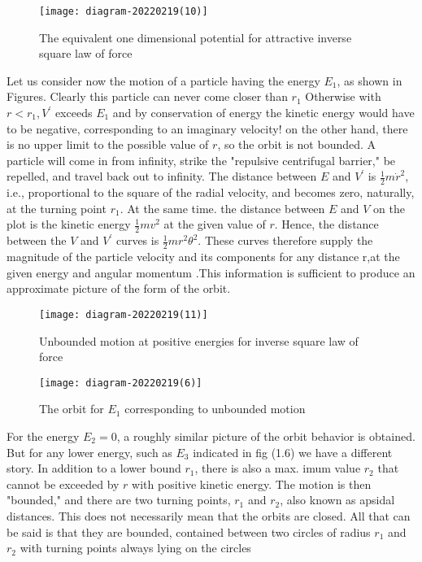 \begin{figure}[H]
	\centering
	\texttt{[image: diagram-20220219(10)]}
	\caption{The equivalent one dimensional potential for attractive inverse square law of force}
	\label{}
\end{figure}
Let us consider now the motion of a particle having the energy $E_{1}$, as shown in Figures. Clearly this particle can never come closer than $r_{1}$  Otherwise with $r<r_{1}, V^{\prime}$ exceeds $E_{1}$ and by conservation of energy the kinetic energy would have to be negative, corresponding to an imaginary velocity! on the other hand, there is no upper limit to the possible value of $r$, so the orbit is not bounded. A particle will come in from infinity, strike the "repulsive centrifugal barrier," be repelled, and travel back out to infinity. The distance between $E$ and $V^{\prime}$ is $\frac{1}{2} m \dot{r}^{2}$, i.e., proportional to the square of the radial velocity, and becomes zero, naturally, at the turning point $r_{1}$. At the same time. the distance between $E$ and $V$ on the plot is the kinetic energy $\frac{1}{2} m v^{2}$ at the given value of $r$. Hence, the distance between the $V$ and $V^{\prime}$ curves is $\frac{1}{2} m r^{2} \theta^{2}$. These curves therefore supply the magnitude of the particle velocity and its components for any distance r,at the given energy and angular momentum .This information is sufficient to produce an approximate picture of the form of the orbit.\\
\begin{minipage}{0.5\textwidth}
\begin{figure}[H]
	\centering
	\texttt{[image: diagram-20220219(11)]}
	\caption{Unbounded motion at positive energies for inverse square law of force}
	\label{}
\end{figure}
\end{minipage}
\begin{minipage}{0.5\textwidth}
\begin{figure}[H]
	\centering
	\texttt{[image: diagram-20220219(6)]}
	\caption{The orbit for $E_1$ corresponding to unbounded motion}
	\label{}
\end{figure}
\end{minipage}
\par For the energy $E_{2}=0$, a roughly similar picture of the orbit behavior is obtained. But for any lower energy, such as $E_{3}$ indicated in fig (1.6) we have a different story. In addition to a lower bound $r_{1}$, there is also a max. imum value $r_{2}$ that cannot be exceeded by $r$ with positive kinetic energy. The motion is then "bounded," and there are two turning points, $r_{1}$ and $r_{2}$, also known as apsidal distances. This does not necessarily mean that the orbits are closed. All that can be said is that they are bounded, contained between two circles of radius $r_{1}$ and $r_{2}$ with turning points always lying on the circles\\
